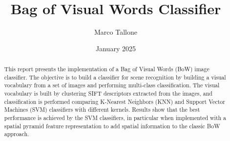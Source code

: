 \documentclass{settings/notex}
\title{
  Bag of Visual Words Classifier\\
  \vspace{0.35cm}
  \fontsize{12pt}{12pt}\selectfont{
    Computer Vision and Pattern Recognition Exam\\
    \vspace{0.25cm}
    University of Trieste (UniTS)
  }
}
\author{Marco Tallone}
\date{January 2025}
\begin{document}
\maketitle

\begin{abstract}
\noindent
This report presents the implementation of a Bag of Visual Words (BoW) image classifier.
The objective is to build a classifier for scene recognition by building a
visual vocabulary from a set of images and performing multi-class classification.
The visual vocabulary is built by clustering SIFT descriptors extracted from the
images, and classification is performed comparing K-Nearest Neighbors (KNN)
and Support Vector Machines (SVM) classifiers with different kernels.
Results show that the best performance is achieved by the SVM classifiers, in particular when implemented with a spatial pyramid feature representation to add spatial information to the classic BoW approach.
\end{abstract}










\pagebreak



\pagebreak
\appendix
\renewcommand{\thesection}{\Alph{section}} %
\renewcommand{\thesubsection}{\thesection\arabic{subsection}} %

\end{document}
